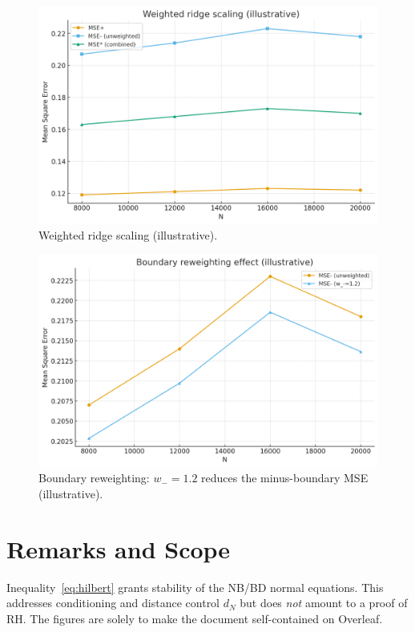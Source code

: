 \documentclass[12pt]{article}
\theoremstyle{remark}
\begin{document}
\begin{figure}[h]
\centering
\includegraphics[width=0.75\linewidth]{weighted_scaling.png}
\caption{Weighted ridge scaling (illustrative).}
\end{figure}

\begin{figure}[h]
\centering
\includegraphics[width=0.75\linewidth]{boundary_reweighting.png}
\caption{Boundary reweighting: $w_- = 1.2$ reduces the minus-boundary MSE (illustrative).}
\end{figure}

\section{Remarks and Scope}
Inequality~\eqref{eq:hilbert} grants stability of the NB/BD normal equations.
This addresses conditioning and distance control $d_N$ but does \emph{not} amount to a proof of RH.
The figures are solely to make the document self-contained on Overleaf.
\end{document}
